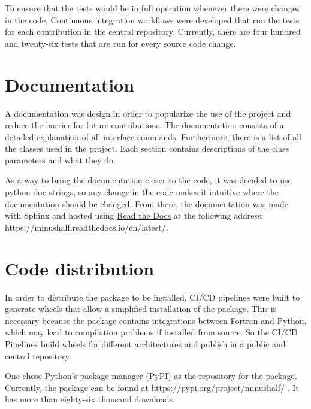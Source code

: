 To ensure that the tests would be in full operation whenever there were changes in the code, Continuous integration workflows were developed that run the tests for each contribution in the central repository. Currently, there are four hundred and twenty-six tests that are run for every source code change.

\section{Documentation}
A documentation was design in order to popularize the use of the project and reduce the barrier for future contributions. The documentation consists of a detailed explanation of all interface commands. Furthermore, there is a list of all the classes used in the project. Each section contains descriptions of the class parameters and what they do.

As a way to bring the documentation closer to the code, it was decided to use python doc strings, so any change in the code makes it intuitive where the documentation should be changed. From there, the documentation was made with Sphinx and hosted using
\href{https://readthedocs.org/}{Read the Docs} at the following address: https://minushalf.readthedocs.io/en/latest/.

\section{Code distribution}
In order to distribute the package to be installed, CI/CD pipelines were built to generate wheels that allow a simplified installation of the package. This is necessary because the package contains integrations between Fortran and Python, which may lead to compilation problems if installed from source. So the CI/CD Pipelines build wheels for different architectures and publish in a public and central repository.

One chose Python's package manager (PyPI) as the repository for the package. Currently, the package can be found at https://pypi.org/project/minushalf/ \cite{Henrique2021} \cite{Henrique2020}. It has more than eighty-six thousand downloads.